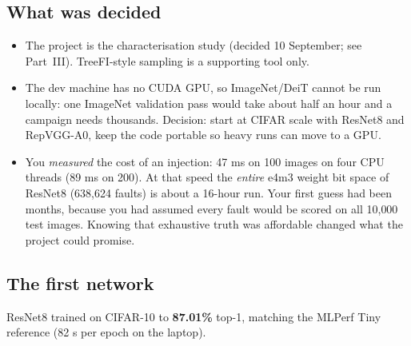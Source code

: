 \subsection{What was decided}
\begin{itemize}
\item The project is the characterisation study (decided 10 September; see Part~III). TreeFI-style sampling is a supporting tool only.
\item The dev machine has no CUDA GPU, so ImageNet/DeiT cannot be run locally: one ImageNet validation pass would take about half an hour and a campaign needs thousands. Decision: start at CIFAR scale with ResNet8 and RepVGG-A0, keep the code portable so heavy runs can move to a GPU.
\item You \emph{measured} the cost of an injection: 47 ms on 100 images on four CPU threads (89 ms on 200). At that speed the \emph{entire} e4m3 weight bit space of ResNet8 (638{,}624 faults) is about a 16-hour run. Your first guess had been months, because you had assumed every fault would be scored on all 10{,}000 test images.
 Knowing that exhaustive truth was affordable changed what the project could promise.
\end{itemize}

\subsection{The first network}
ResNet8 trained on CIFAR-10 to \textbf{87.01\%} top-1, matching the MLPerf Tiny reference (82 s per epoch on the laptop).

